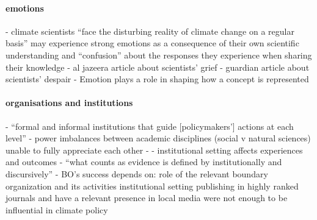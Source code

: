 \paragraph{emotions}
\cite{RandallH2019} - climate scientists ``face the disturbing reality of climate change on a regular basis'' may experience strong emotions as a consequence of their own scientific understanding and ``confusion'' about the responses they experience when sharing their knowledge
\cite{Pivovarchuk2024} - al jazeera article about scientists' grief
\cite{Carrington2024} - guardian article about scientists' despair
\cite{Makin2024} - Emotion plays a role in shaping how a concept is represented
\paragraph{organisations and institutions}
\cite{CairneyW2017} - ``formal and informal institutions that guide [policymakers'] actions at each level''
\cite{BalvaneraJNOBCDGGKKMPSSW2020} - power imbalances between academic disciplines (social v natural sciences) unable to fully appreciate each other
\cite{GeuijenMCRv2017} - 
\cite{SaxonbergSL2023} - institutional setting affects experiences and outcomes
\cite{StrassheimK2014} - ``what counts as evidence is defined by institutionally and discursively''
\cite{WesselinkH2020} - BO's success depends on: role of the relevant boundary organization and its activities
institutional setting \cite{WeyrauchES2016,OjanenBKP2021,SaxonbergSL2023}
\cite{IbarraJOBCIMRS2022} publishing in highly ranked journals and have a relevant presence in local media were not enough to be influential in climate policy
